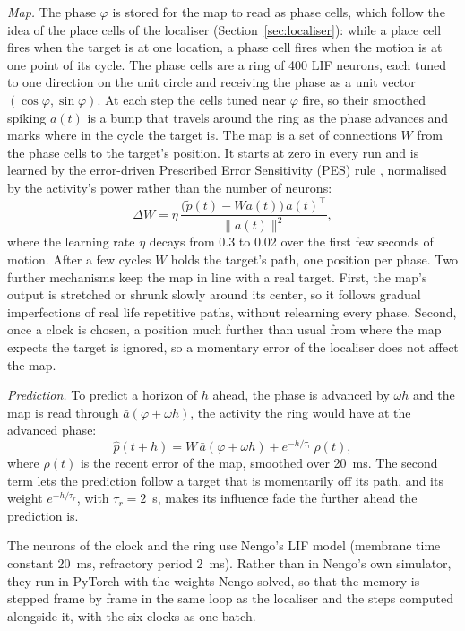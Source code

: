 \documentclass[conference]{IEEEtran}
\begin{document}
\emph{Map.} The phase $\varphi$ is stored for the map to read as phase cells, which follow the idea of the place cells of the localiser (Section~\ref{sec:localiser}): while a place cell fires when the target is at one location, a phase cell fires when the motion is at one point of its cycle. The phase cells are a ring of 400 LIF neurons, each tuned to one direction on the unit circle and receiving the phase as a unit vector $(\cos\varphi, \sin\varphi)$. At each step the cells tuned near $\varphi$ fire, so their smoothed spiking $a(t)$ is a bump that travels around the ring as the phase advances and marks where in the cycle the target is. The map is a set of connections $W$ from the phase cells to the target's position. It starts at zero in every run and is learned by the error-driven Prescribed Error Sensitivity (PES) rule \cite{MacNeil2011Fine}, normalised by the activity's power rather than the number of neurons:
\begin{equation}
\Delta W = \eta\,\frac{\big(\tilde{p}(t) - W a(t)\big)\,a(t)^{\top}}{\lVert a(t)\rVert^{2}},
\end{equation}
where the learning rate $\eta$ decays from 0.3 to 0.02 over the first few seconds of motion. After a few cycles $W$ holds the target's path, one position per phase. Two further mechanisms keep the map in line with a real target. First, the map's output is stretched or shrunk slowly around its center, so it follows gradual imperfections of real life repetitive paths, without relearning every phase. Second, once a clock is chosen, a position much further than usual from where the map expects the target is ignored, so a momentary error of the localiser does not affect the map.

\emph{Prediction.} To predict a horizon of $h$ ahead, the phase is advanced by $\omega h$ and the map is read through $\bar{a}(\varphi + \omega h)$, the activity the ring would have at the advanced phase:
\begin{equation}
\hat{p}(t+h) = W\,\bar{a}(\varphi + \omega h) + e^{-h/\tau_r}\,\rho(t),
\end{equation}
where $\rho(t)$ is the recent error of the map, smoothed over 20~ms. The second term lets the prediction follow a target that is momentarily off its path, and its weight $e^{-h/\tau_r}$, with $\tau_r = 2$~s, makes its influence fade the further ahead the prediction is.

The neurons of the clock and the ring use Nengo's LIF model (membrane time constant 20~ms, refractory period 2~ms). Rather than in Nengo's own simulator, they run in PyTorch with the weights Nengo solved, so that the memory is stepped frame by frame in the same loop as the localiser and the steps computed alongside it, with the six clocks as one batch.
\end{document}
